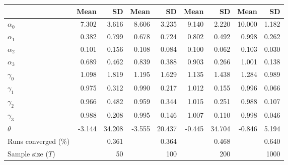 
\begin{tabular}[t]{lrrrrrrrr}
\toprule
  & Mean & SD & Mean  & SD  & Mean   & SD   & Mean    & SD   \\
\midrule
$\alpha_{0}$ & 7.302 & 3.616 & 8.606 & 3.235 & 9.140 & 2.220 & 10.000 & 1.182\\
$\alpha_{1}$ & 0.382 & 0.799 & 0.678 & 0.724 & 0.802 & 0.492 & 0.998 & 0.262\\
$\alpha_{2}$ & 0.101 & 0.156 & 0.108 & 0.084 & 0.100 & 0.062 & 0.103 & 0.030\\
$\alpha_{3}$ & 0.689 & 0.462 & 0.839 & 0.388 & 0.903 & 0.266 & 1.001 & 0.138\\
$\gamma_{0}$ & 1.098 & 1.819 & 1.195 & 1.629 & 1.135 & 1.438 & 1.284 & 0.989\\
$\gamma_{1}$ & 0.975 & 0.312 & 0.990 & 0.217 & 1.012 & 0.155 & 0.996 & 0.066\\
$\gamma_{2}$ & 0.966 & 0.482 & 0.959 & 0.344 & 1.015 & 0.251 & 0.988 & 0.107\\
$\gamma_{3}$ & 0.988 & 0.208 & 0.995 & 0.146 & 1.007 & 0.110 & 0.998 & 0.046\\
$\theta$ & -3.144 & 34.208 & -3.555 & 20.437 & -0.445 & 34.704 & -0.846 & 5.194\\
Runs converged (\%) &  & 0.361 &  & 0.364 &  & 0.468 &  & 0.640\\
Sample size ($T$) &  & 50 &  & 100 &  & 200 &  & 1000\\
\bottomrule
\end{tabular}
